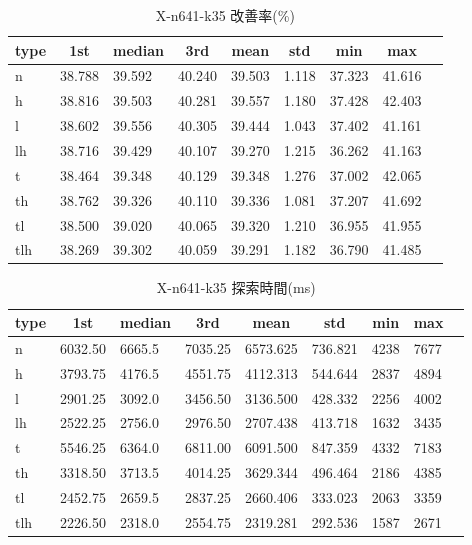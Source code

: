 \begin{table}[htbp]
    \centering
    \caption{X-n641-k35 改善率(\%)}
    \begin{tabular}{|l|l|l|l|l|l|l|l|l|}\hline
    \multicolumn{1}{|c|}{\textbf{type}}
    &\multicolumn{1}{|c|}{\textbf{1st}}
    &\multicolumn{1}{c|}{\textbf{median}}
    &\multicolumn{1}{c|}{\textbf{3rd}}
    &\multicolumn{1}{c|}{\textbf{mean}}
    &\multicolumn{1}{c|}{\textbf{std}}
    &\multicolumn{1}{c|}{\textbf{min}}
    &\multicolumn{1}{c|}{\textbf{max}}\\\hline
	n & 38.788 & 39.592 & 40.240 & 39.503 & 1.118 & 37.323 & 41.616\\\hline
	h & 38.816 & 39.503 & 40.281 & 39.557 & 1.180 & 37.428 & 42.403\\\hline
	l & 38.602 & 39.556 & 40.305 & 39.444 & 1.043 & 37.402 & 41.161\\\hline
	lh & 38.716 & 39.429 & 40.107 & 39.270 & 1.215 & 36.262 & 41.163\\\hline
	t & 38.464 & 39.348 & 40.129 & 39.348 & 1.276 & 37.002 & 42.065\\\hline
	th & 38.762 & 39.326 & 40.110 & 39.336 & 1.081 & 37.207 & 41.692\\\hline
	tl & 38.500 & 39.020 & 40.065 & 39.320 & 1.210 & 36.955 & 41.955\\\hline
	tlh & 38.269 & 39.302 & 40.059 & 39.291 & 1.182 & 36.790 & 41.485\\\hline
	\end{tabular}
\end{table}
\begin{table}[htbp]
    \centering
    \caption{X-n641-k35 探索時間(ms)}
    \begin{tabular}{|l|l|l|l|l|l|l|l|l|}\hline
    \multicolumn{1}{|c|}{\textbf{type}}
    &\multicolumn{1}{|c|}{\textbf{1st}}
    &\multicolumn{1}{c|}{\textbf{median}}
    &\multicolumn{1}{c|}{\textbf{3rd}}
    &\multicolumn{1}{c|}{\textbf{mean}}
    &\multicolumn{1}{c|}{\textbf{std}}
    &\multicolumn{1}{c|}{\textbf{min}}
    &\multicolumn{1}{c|}{\textbf{max}}\\\hline
	n & 6032.50 & 6665.5 & 7035.25 & 6573.625 & 736.821 & 4238 & 7677\\\hline
	h & 3793.75 & 4176.5 & 4551.75 & 4112.313 & 544.644 & 2837 & 4894\\\hline
	l & 2901.25 & 3092.0 & 3456.50 & 3136.500 & 428.332 & 2256 & 4002\\\hline
	lh & 2522.25 & 2756.0 & 2976.50 & 2707.438 & 413.718 & 1632 & 3435\\\hline
	t & 5546.25 & 6364.0 & 6811.00 & 6091.500 & 847.359 & 4332 & 7183\\\hline
	th & 3318.50 & 3713.5 & 4014.25 & 3629.344 & 496.464 & 2186 & 4385\\\hline
	tl & 2452.75 & 2659.5 & 2837.25 & 2660.406 & 333.023 & 2063 & 3359\\\hline
	tlh & 2226.50 & 2318.0 & 2554.75 & 2319.281 & 292.536 & 1587 & 2671\\\hline
	\end{tabular}
\end{table}
